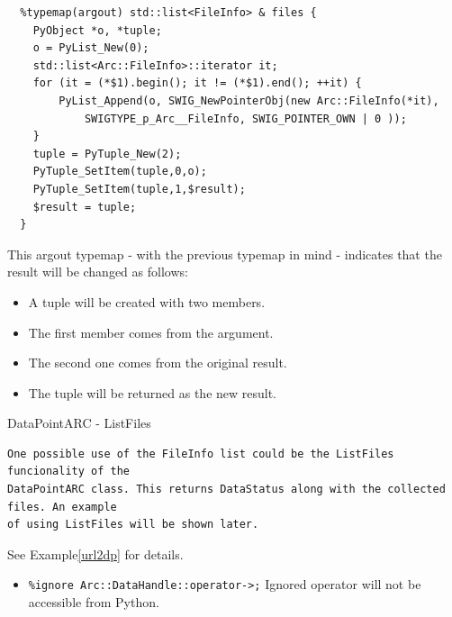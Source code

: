 \documentclass{article}
\begin{document}
\begin{flushleft}
\begin{itemize}
{  \begin{verbatim}
  %typemap(argout) std::list<FileInfo> & files {
    PyObject *o, *tuple;
    o = PyList_New(0);
    std::list<Arc::FileInfo>::iterator it;
    for (it = (*$1).begin(); it != (*$1).end(); ++it) {
        PyList_Append(o, SWIG_NewPointerObj(new Arc::FileInfo(*it), 
            SWIGTYPE_p_Arc__FileInfo, SWIG_POINTER_OWN | 0 ));
    }
    tuple = PyTuple_New(2);
    PyTuple_SetItem(tuple,0,o);
    PyTuple_SetItem(tuple,1,$result);
    $result = tuple;
  }
  \end{verbatim}
  This argout typemap - with the previous typemap in mind - indicates that the result will be changed as follows:
    \begin{itemize}
    \item{
      A tuple will be created with two members.
    }
    \item{
      The first member comes from the argument.
    }
    \item{
      The second one comes from the original result.
    }
    \item{
      The tuple will be returned as the new result.
    }
    \end{itemize}
    \begin{example}
      \caption{DataPointARC - ListFiles}\label{lfex}
\begin{verbatim}
One possible use of the FileInfo list could be the ListFiles funcionality of the 
DataPointARC class. This returns DataStatus along with the collected files. An example 
of using ListFiles will be shown later.
\end{verbatim} See Example\ref{url2dp} for details.
    \end{example}
  }
\end{itemize}
\begin{itemize}
  \item{\verb$%ignore Arc::DataHandle::operator->;$} \linebreak
  Ignored operator will not be accessible from Python.
\end{itemize}
\end{flushleft}
\end{document}
